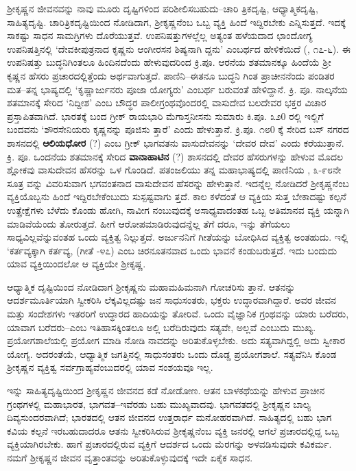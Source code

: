 ಶ್ರೀಕೃಷ್ಣನ ಜೀವನವನ್ನು ನಾವು ಮೂರು ದೃಷ್ಟಿಗಳಿಂದ ಪರಿಶೀಲಿಸಬಹುದು–ಚಾರಿ ತ್ರಿಕದೃಷ್ಟಿ, ಆಧ್ಯಾತ್ಮಿಕದೃಷ್ಟಿ, ಸಾಹಿತ್ಯದೃಷ್ಟಿ. ಚಾರಿತ್ರಿಕದೃಷ್ಟಿಯಿಂದ ನೋಡಿದಾಗ, ಶ್ರೀಕೃಷ್ಣನೆಂಬ ಒಬ್ಬ ವ್ಯಕ್ತಿ ಹಿಂದೆ ಇದ್ದಿರಬೇಕು ಎನ್ನಿಸುತ್ತದೆ. ಇದಕ್ಕೆ ಸಾಕಷ್ಟು ಸಾಧನ ಸಾಮಗ್ರಿಗಳು ದೊರೆಯುತ್ತವೆ. ಉಪನಿಷತ್ತುಗಳಲ್ಲೆಲ್ಲ ಅತ್ಯಂತ ಹಳೆಯದಾದ ಛಾಂದೋಗ್ಯ ಉಪನಿಷತ್ತಿನಲ್ಲಿ ‘ದೇವಕೀಪುತ್ರನಾದ ಕೃಷ್ಣನು ಆಂಗೀರಸನ ಶಿಷ್ಯನಾಗಿ ದ್ದನು’ ಎಂಬರ್ಥದ ಹೇಳಿಕೆಯಿದೆ (, ೧೭-೬). ಈ ಉಪನಿಷತ್ತು ಬುದ್ಧನಿಗಿಂತಲೂ ಹಿಂದಿನದೆಂದು ಹೇಳುವುದರಿಂದ ಕ್ರಿ.ಪೂ. ಆರನೆಯ ಶತಮಾನಕ್ಕೂ ಹಿಂದೆಯೆ ಶ್ರೀ ಕೃಷ್ಣನ ಹೆಸರು ಪ್ರಚಾರದಲ್ಲಿತ್ತೆಂದು ಅರ್ಥವಾಗುತ್ತದೆ. ಪಾಣಿನಿ–ಈತನೂ ಬುದ್ಧನಿ ಗಿಂತ ಪ್ರಾಚೀನನೆಂದು ಪಂಡಿತರ ಮತ–ತನ್ನ ಭಾಷ್ಯದಲ್ಲಿ ‘ಕೃಷ್ಣಾರ್ಜುನರು ಪೂಜಾ ಯೋಗ್ಯರು’ ಎಂಬರ್ಥ ಬರುವಂತೆ ಹೇಳಿದ್ದಾನೆ. ಕ್ರಿ. ಪೂ. ನಾಲ್ಕನೆಯ ಶತಮಾನಕ್ಕೆ ಸೇರಿದ ‘ನಿದ್ದೀಶ’ ಎಂಬ ಬೌದ್ಧರ ಪಾಲೀಗ್ರಂಥವೊಂದರಲ್ಲಿ ವಾಸುದೇವ ಬಲದೇವರ ಭಕ್ತರ ವಿಚಾರ ಪ್ರಸ್ತಾಪಿತವಾಗಿದೆ. ಭಾರತಕ್ಕೆ ಬಂದ ಗ್ರೀಕ್ ರಾಯಭಾರಿ ಮೆಗಾಸ್ತನೀಸನು ಸುಮಾರು ಕಿ.ಪೂ. ೩೨0 ರಲ್ಲಿ ಇಲ್ಲಿಗೆ ಬಂದವನು ‘ಶೌರಸೇನಿಯರು ಕೃಷ್ಣನನ್ನು ಪೂಜಿಸು ತ್ತಾರೆ’ ಎಂದು ಹೇಳುತ್ತಾನೆ. ಕ್ರಿ.ಪೂ. ೧೮0 ಕ್ಕೆ ಸೇರಿದ ಬಸ್ ನಗರದ ಶಾಸನದಲ್ಲಿ \textbf{ಆಲಿಯಧೋರ} (?) ಎಂಬ ಗ್ರೀಕ್ ಭಾಗವತನು ವಾಸುದೇವನನ್ನು ‘ದೇವರ ದೇವ’ ಎಂದು ಕರೆಯುತ್ತಾನೆ. ಕ್ರಿ. ಪೂ. ಒಂದನೆಯ ಶತಮಾನಕ್ಕೆ ಸೇರಿದ \textbf{ವಾನಾಹಾಟಿನ} (?) ಶಾಸನದಲ್ಲಿ ದೇವರ ಹೆಸರುಗಳನ್ನು ಹೇಳುವ ಮೊದಲ ಶ್ಲೋಕವು ವಾಸುದೇವನ ಹೆಸರನ್ನು ಒಳ ಗೊಂಡಿದೆ. ಪತಂಜಲಿಯು ತನ್ನ ಮಹಾಭಾಷ್ಯದಲ್ಲಿ ಪಾಣಿನಿಯ , ೩-೯೮ನೇ ಸೂತ್ರ ವನ್ನು ವಿವರಿಸುವಾಗ ಭಗವಂತನಾದ ವಾಸುದೇವನ ಹೆಸರನ್ನು ಹೇಳುತ್ತಾನೆ. ಇದನ್ನೆಲ್ಲ ನೋಡಿದರೆ ಶ್ರೀಕೃಷ್ಣನೆಂಬ ವ್ಯಕ್ತಿಯೊಬ್ಬನು ಹಿಂದೆ ಇದ್ದಿರಬೇಕೆಂಬುದು ಸುಸ್ಪಷ್ಟವಾಗು ತ್ತದೆ. ಕಾಲ ಕಳೆದಂತೆ ಆ ವ್ಯಕ್ತಿಯ ಸುತ್ತ ಬೇಕಾದಷ್ಟು ಕಲ್ಪನೆ ಉತ್ಪ್ರೇಕ್ಷೆಗಳು ಬೆಳೆದು ಕೊಂಡು ಹೋಗಿ, ನಾವೀಗ ನಂಬುವುದಕ್ಕೆ ಅಸಾಧ್ಯವಾದಂತಹ ಒಬ್ಬ ಅತಿಮಾನವ ವ್ಯಕ್ತಿ ಯನ್ನಾಗಿ ಮಾಡಿವೆಯೆಂದು ತೋರುತ್ತದೆ. ಹೀಗೆ ಆರೋಪಮಾಡಿರುವುದನ್ನೆಲ್ಲ ತೆಗೆ ದರೂ, ಇನ್ನು ತೆಗೆಯಲು ಸಾಧ್ಯವಿಲ್ಲವೆನ್ನುವಂತಹ ಒಂದು ವ್ಯಕ್ತಿತ್ವ ನಿಲ್ಲುತ್ತದೆ. ಅರ್ಜುನನಿಗೆ ಗೀತೆಯನ್ನು ಬೋಧಿಸಿದ ವ್ಯಕ್ತಿತ್ವ ಅಂತಹುದು. ಇಲ್ಲಿ ‘ಕರ್ತವ್ಯಕ್ಕಾಗಿ ಕರ್ತವ್ಯ, (ಗೀತೆ -೪೭) ಎಂಬ ಚಿರನೂತನವಾದ ಒಂದು ಭಾವನೆ ಕಂಡುಬರುತ್ತದೆ. ಇದು ಬಂದುದು ಯಾವ ವ್ಯಕ್ತಿಯಿಂದಲೋ ಆ ವ್ಯಕ್ತಿಯೇ ಶ್ರೀಕೃಷ್ಣ.

ಆಧ್ಯಾತ್ಮಿಕ ದೃಷ್ಟಿಯಿಂದ ನೋಡಿದಾಗ ಶ್ರೀಕೃಷ್ಣನು ಮಹಾಮಹಿಮನಾಗಿ ಗೋಚರಿಸು ತ್ತಾನೆ. ಆತನನ್ನು ಆದರ್ಶಮೂರ್ತಿಯಾಗಿ ಸ್ವೀಕರಿಸಿ ಲೆಕ್ಕವಿಲ್ಲದಷ್ಟು ಜನ ಸಾಧುಸಂತರು, ಭಕ್ತರು ಉದ್ಧಾರವಾಗಿದ್ದಾರೆ. ಅವರ ಜೀವನ ಮತ್ತು ಸಂದೇಶಗಳು ಇತರರಿಗೆ ಉದ್ಧಾರದ ಹಾದಿಯನ್ನು ತೋರಿವೆ. ಒಂದು ವೈಜ್ಞಾನಿಕ ಗ್ರಂಥವನ್ನು ಯಾರು ಬರೆದರು, ಯಾವಾಗ ಬರೆದರು–ಎಂಬ ಇತಿಹಾಸಕ್ಕಿಂತಲೂ ಅಲ್ಲಿ ಬರೆದಿರುವುದು ಸತ್ಯವೇ, ಅಲ್ಲವೆ ಎಂಬುದು ಮುಖ್ಯ. ಪ್ರಯೋಗಶಾಲೆಯಲ್ಲಿ ಪ್ರಯೋಗ ಮಾಡಿ ನೋಡಿ ನಾವದನ್ನು ಅರಿತುಕೊಳ್ಳಬೇಕು. ಅದು ಸತ್ಯವಾಗಿದ್ದಲ್ಲಿ ಅದು ಸ್ವೀಕಾರ ಯೋಗ್ಯ. ಅದರಂತೆಯೆ, ಆಧ್ಯಾತ್ಮಿಕ ಜಗತ್ತಿನಲ್ಲಿ ಸಾಧುಸಂತರು ಒಂದು ದೊಡ್ಡ ಪ್ರಯೋಗಶಾಲೆ. ಸತ್ಯವೆನಿಸಿ ಕೊಂಡ ಶ್ರೀಕೃಷ್ಣನ ವ್ಯಕ್ತಿತ್ವ ಸರ್ವಗ್ರಾಹ್ಯವೆಂಬುದರಲ್ಲಿ ಯಾವ ಸಂಶಯವೂ ಇಲ್ಲ.

ಇನ್ನು ಸಾಹಿತ್ಯದೃಷ್ಟಿಯಿಂದ ಶ್ರೀಕೃಷ್ಣನ ಜೀವನದ ಕಡೆ ನೋಡೋಣ. ಆತನ ಬಾಳಕಥೆಯನ್ನು ಹೇಳುವ ಪ್ರಾಚೀನ ಗ್ರಂಥಗಳಲ್ಲಿ ಮಹಾಭಾರತ, ಭಾಗವತ–ಇವೆರಡು ಬಹು ಮುಖ್ಯವಾದವು. ಭಾಗವತದಲ್ಲಿ ಶ್ರೀಕೃಷ್ಣನ ಬಾಲ್ಯ ದಿವ್ಯಸುಂದರವಾಗಿದೆ; ಭಾರತದಲ್ಲಿ ಆತನ ಜೀವನದ ಉತ್ತರಾರ್ಧ ಮನೋಹರವಾಗಿದೆ. ಸಾಹಿತ್ಯದಲ್ಲಿ ಬಹು ಭಾಗ ಕವಿಯ ಕಲ್ಪನೆ ಇರಬಹುದಾದರೂ ಆತನು ಸ್ವೀಕರಿಸಿರುವ ಶ್ರೀಕೃಷ್ಣನೆಂಬ ವ್ಯಕ್ತಿ ಜನರಲ್ಲಿ ಆಗಲೆ ಪ್ರಚಾರದಲ್ಲಿದ್ದ ಒಬ್ಬ ವ್ಯಕ್ತಿಯಾಗಿರಬೇಕು. ಹಾಗೆ ಪ್ರಚಾರದಲ್ಲಿರುವ ವ್ಯಕ್ತಿಗೆ ಆದರ್ಶದ ಒಂದು ಮೆರಗನ್ನು ಅಳವಡಿಸುವುದೇ ಕವಿಕರ್ಮ. ನಮಗೆ ಶ್ರೀಕೃಷ್ಣನ ಜೀವನ ವೃತ್ತಾಂತವನ್ನು ಅರಿತುಕೊಳ್ಳುವುದಕ್ಕೆ ಇದೇ ಏಕೈಕ ಸಾಧನ.

